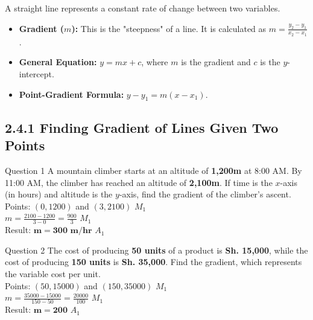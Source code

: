\documentclass[12pt, a4paper, oneside]{article}
\begin{document}
\begin{tcolorbox}[colback=lightgrey, colframe=primaryblue, title=\textbf{Teacher's Concept: The Geometry of Slopes}, arc=5pt]
    A straight line represents a constant rate of change between two variables.
    \begin{itemize}
        \item \textbf{Gradient ($m$):} This is the "steepness" of a line. It is calculated as $m = \frac{y_2 - y_1}{x_2 - x_1}$.
        \item \textbf{General Equation:} $y = mx + c$, where $m$ is the gradient and $c$ is the $y$-intercept.
        \item \textbf{Point-Gradient Formula:} $y - y_1 = m(x - x_1)$.
    \end{itemize}
\end{tcolorbox}

\subsection*{2.4.1 Finding Gradient of Lines Given Two Points}

\begin{solvingbox}{Question 1}
A mountain climber starts at an altitude of \textbf{1,200m} at 8:00 AM. By 11:00 AM, the climber has reached an altitude of \textbf{2,100m}. If time is the $x$-axis (in hours) and altitude is the $y$-axis, find the gradient of the climber's ascent. \\
Points: $(0, 1200)$ and $(3, 2100)$ \hfill $M_1$ \\
$m = \frac{2100 - 1200}{3 - 0} = \frac{900}{3}$ \hfill $M_1$ \\
Result: $\mathbf{m = 300\text{ m/hr}}$ \hfill $A_1$
\end{solvingbox}

\begin{solvingbox}{Question 2}
The cost of producing \textbf{50 units} of a product is \textbf{Sh. 15,000}, while the cost of producing \textbf{150 units} is \textbf{Sh. 35,000}. Find the gradient, which represents the variable cost per unit. \\
Points: $(50, 15000)$ and $(150, 35000)$ \hfill $M_1$ \\
$m = \frac{35000 - 15000}{150 - 50} = \frac{20000}{100}$ \hfill $M_1$ \\
Result: $\mathbf{m = 200}$ \hfill $A_1$
\end{solvingbox}
\end{document}
